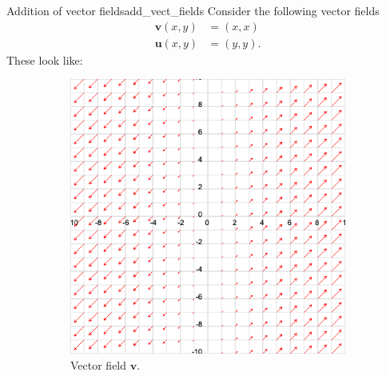         \begin{ex}{Addition of vector fields}{add_vect_fields}
        Consider the following vector fields
        \begin{align*}
            \mathbf{v}(x,y)&=(x,x)\\
            \mathbf{u}(x,y)&=(y,y).
        \end{align*}
        These look like:
        \begin{figure}[H]
            \centering
            \begin{subfigure}[h]{.45\textwidth}
            \includegraphics[width=\textwidth]{Figures_Part_6/vec_v.png}
            \caption{Vector field $\mathbf{v}$.}
            \end{subfigure}
            ~
            \begin{subfigure}[h]{.45\textwidth}

\end{subfigure}
\end{figure}
\end{ex}
